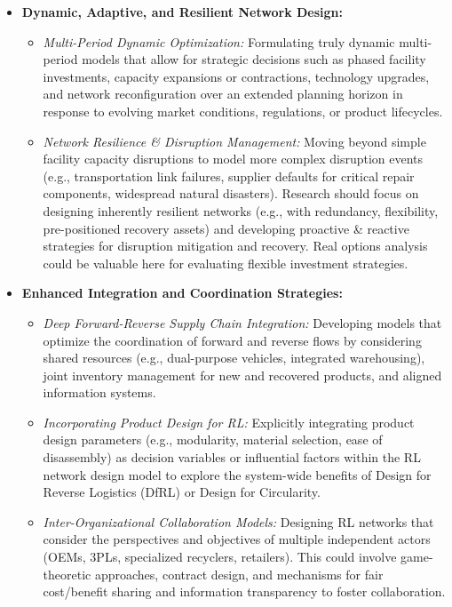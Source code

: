 \begin{itemize}
    \item \textbf{Dynamic, Adaptive, and Resilient Network Design:}
        \begin{itemize}
            \item \textit{Multi-Period Dynamic Optimization:} Formulating truly dynamic multi-period models that allow for strategic decisions such as phased facility investments, capacity expansions or contractions, technology upgrades, and network reconfiguration over an extended planning horizon in response to evolving market conditions, regulations, or product lifecycles.
            \item \textit{Network Resilience \& Disruption Management:} Moving beyond simple facility capacity disruptions to model more complex disruption events (e.g., transportation link failures, supplier defaults for critical repair components, widespread natural disasters). Research should focus on designing inherently resilient networks (e.g., with redundancy, flexibility, pre-positioned recovery assets) and developing proactive \& reactive strategies for disruption mitigation and recovery. Real options analysis could be valuable here for evaluating flexible investment strategies.
        \end{itemize}

    \item \textbf{Enhanced Integration and Coordination Strategies:}
        \begin{itemize}
            \item \textit{Deep Forward-Reverse Supply Chain Integration:} Developing models that optimize the coordination of forward and reverse flows by considering shared resources (e.g., dual-purpose vehicles, integrated warehousing), joint inventory management for new and recovered products, and aligned information systems.
            \item \textit{Incorporating Product Design for RL:} Explicitly integrating product design parameters (e.g., modularity, material selection, ease of disassembly) as decision variables or influential factors within the RL network design model to explore the system-wide benefits of Design for Reverse Logistics (DfRL) or Design for Circularity.
            \item \textit{Inter-Organizational Collaboration Models:} Designing RL networks that consider the perspectives and objectives of multiple independent actors (OEMs, 3PLs, specialized recyclers, retailers). This could involve game-theoretic approaches, contract design, and mechanisms for fair cost/benefit sharing and information transparency to foster collaboration.
        \end{itemize}


\end{itemize}
